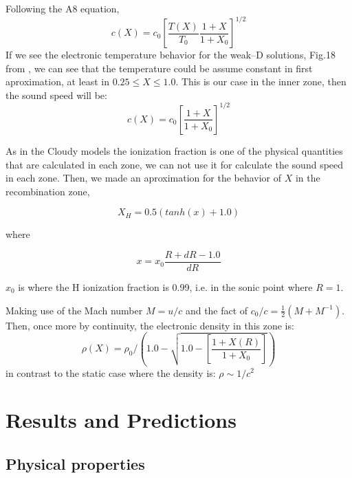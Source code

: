 \documentclass[aaspp]{article}
\begin{document}
Following the A8 equation, 
\begin{equation}
  c(X) = c_0 \left [ \frac{T(X)}{T_0} \frac{1+X}{1+X_0}\right]^{1/2}
\end{equation}
If we see the electronic temperature behavior for the weak--D solutions, Fig.18 from \citet{2005ApJ...621..328H}, we can see that the temperature could be assume constant in first aproximation, at least in $0.25 \le X \le 1.0$. This is our case in the inner zone, then the sound speed will be:
\begin{equation}
  c(X) = c_0 \left [ \frac{1+X}{1+X_0}\right]^{1/2}
\end{equation}

As in the Cloudy models the ionization fraction is one of the physical quantities that are calculated in each zone, we can not use it for calculate the sound speed in each zone. Then, we made an aproximation for the behavior of $X$ in the recombination zone, 

\begin{equation}
  X_H = 0.5 (tan h (x) + 1.0)
\end{equation}

where 

\begin{equation}
  x = x_0 \frac{R + dR -1.0}{dR}
\end{equation}

$x_0$ is where the H ionization fraction is 0.99, i.e. in the sonic point where $R = 1$.

Making use of the Mach number $M = u/c$ and the fact of $c_0/c = \frac{1}{2} \left ( M + M^{-1} \right)$. Then, once more by continuity, the electronic density in this zone is:
\begin{equation}
  \rho (X) = \rho_0 / \left ( 1.0 - \sqrt{ 1.0 - \left [ \frac{1+X(R)}{1+X_0} \right ]} \right )
\end{equation}
in contrast to the static case where the density is: $\rho \sim 1/c^2$

\section{Results and Predictions}
\label{sec:results}



\subsection{Physical properties}
\label{sec:physical}
\end{document}
